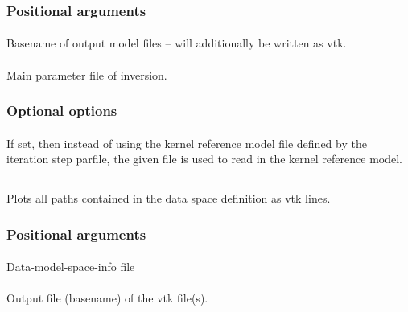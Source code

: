 \subsubsection{Positional arguments}
\paragraph{}
Basename of output model files -- will additionally be written as vtk.
\paragraph{}
Main parameter file of inversion.
\subsubsection{Optional options}
\paragraph{}
If set, then instead of using the kernel reference model file defined by the iteration step parfile, 
the given file  is used to read in the kernel reference model.
%
%
\subsection{} \label{programs_scripts,sec:bin_prog,sec:path_to_vtk}  
Plots all paths contained in the data space definition as vtk lines. 
\subsubsection{Positional arguments}
\paragraph{}
Data-model-space-info file   
\paragraph{}
Output file (basename) of the vtk file(s).
